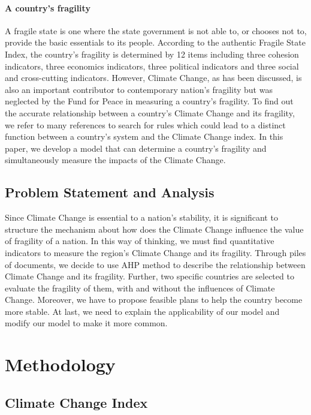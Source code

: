 \documentclass[a4paper,12pt]{article}
\begin{document}
\paragraph{A country's fragility}
A fragile state is one where the state government is not able to, or chooses not to, provide the basic essentials to its people. According to the authentic Fragile State Index, the country's fragility is determined by 12 items including three cohesion indicators, three economics indicators, three political indicators and three social and cross-cutting indicators. However, Climate Change, as has been discussed, is also an important contributor to contemporary nation's fragility but was neglected by the Fund for Peace in measuring a country's fragility. To find out the accurate relationship between a country's Climate Change and its fragility, we refer to many references to search for rules which could lead to a distinct function between a country's system and the Climate Change index. In this paper, we develop a model that can determine a country's fragility and simultaneously measure the impacts of the Climate Change.
\subsection{Problem Statement and Analysis}

Since Climate Change is essential to a nation's stability, it is significant to structure the mechanism about how does the Climate Change influence the value of fragility of a nation. In this way of thinking, we must find quantitative indicators to measure the region's Climate Change and its fragility. Through piles of documents, we decide to use AHP method to describe the relationship between Climate Change and its fragility. Further, two specific countries are selected to evaluate the fragility of them, with and without the influences of Climate Change. Moreover, we have to propose feasible plans to help the country become more stable. At last, we need to explain the applicability of our model and modify our model to make it more common.   

\section{Methodology}

\subsection{Climate Change Index}
\label{sec:document-classes}
\end{document}

